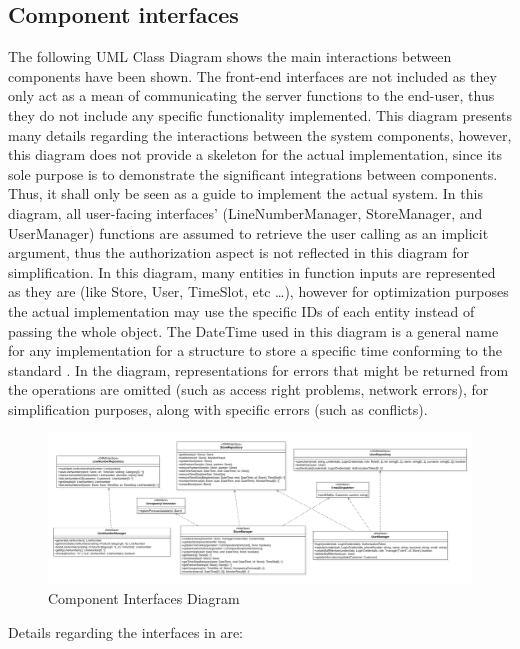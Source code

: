 \subsection{Component interfaces}
The following UML Class Diagram shows the main interactions between components have been shown.
The front-end interfaces are not included as they only act as a mean of communicating the server functions to the end-user, thus they do not include any specific functionality implemented.
This diagram presents many details regarding the interactions between the system components, however, this diagram does not provide a skeleton for the actual implementation, since its sole purpose is to demonstrate the significant integrations between components.
Thus, it shall only be seen as a guide to implement the actual system.
In this diagram, all user-facing interfaces' (LineNumberManager, StoreManager, and UserManager) functions are assumed to retrieve the user calling as an implicit argument, thus the authorization aspect is not reflected in this diagram for simplification.
In this diagram, many entities in function inputs are represented as they are (like Store, User, TimeSlot, etc \ldots), however for optimization purposes the actual implementation may use the specific IDs of each entity instead of passing the whole object.
The DateTime used in this diagram is a general name for any implementation for a structure to store a specific time conforming to the standard \cite{}.
In the diagram, representations for errors that might be returned from the operations are omitted (such as access right problems, network errors), for simplification purposes, along with specific errors (such as conflicts).
\begin{figure}[H]
    \centering
    \includegraphics[height=0.4\textwidth]{Images/ComponentInterfacesDiagram.png}
    \caption{Component Interfaces Diagram}
    \label{fig:ComponentInterfaces}
\end{figure}
Details regarding the interfaces in  are:
